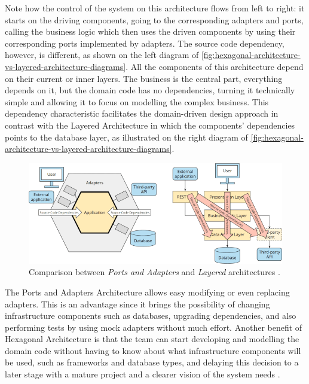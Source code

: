 Note how the control of the system on this architecture flows from left to right: it starts on the driving components, going to the corresponding adapters and ports, calling the business logic which then uses the driven components by using their corresponding ports implemented by adapters. The source code dependency, however, is different, as shown on the left diagram of \autoref{fig:hexagonal-architecture-vs-layered-architecture-diagrams}. All the components of this architecture depend on their current or inner layers. The business is the central part, everything depends on it, but the domain code has no dependencies, turning it technically simple and allowing it to focus on modelling the complex business. This dependency characteristic facilitates the domain-driven design approach in contrast with the Layered Architecture in which the components' dependencies points to the database layer, as illustrated on the right diagram of \autoref{fig:hexagonal-architecture-vs-layered-architecture-diagrams}.

\begin{figure}[htbp]
  \centering
  \includegraphics[scale=0.5]{Imagens/chap04/hexagonal-architecture-vs-layered-architecture-diagrams.png}
  \caption{Comparison between \textit{Ports and Adapters} and \textit{Layered} architectures \cite{sven-woltmann-hexagonal-architecture}.}
  \label{fig:hexagonal-architecture-vs-layered-architecture-diagrams}
\end{figure}

The Ports and Adapters Architecture allows easy modifying or even replacing adapters. This is an advantage since it brings the possibility of changing infrastructure components such as databases, upgrading dependencies, and also performing tests by using mock adapters without much effort. Another benefit of Hexagonal Architecture is that the team can start developing and modelling the domain code without having to know about what infrastructure components will be used, such as frameworks and database types, and delaying this decision to a later stage with a mature project and a clearer vision of the system needs \cite{sven-woltmann-hexagonal-architecture}.

